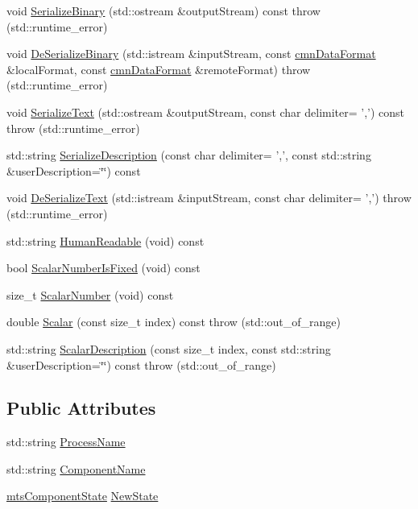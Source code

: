 \begin{DoxyCompactItemize}
\item 
void \hyperlink{classmts_component_state_change_a9d47989b56c5f09d4c5f45f1233be08f}{Serialize\-Binary} (std\-::ostream \&output\-Stream) const   throw (std\-::runtime\-\_\-error)
\item 
void \hyperlink{classmts_component_state_change_a94fcb305f49b48544d9622b5ba548994}{De\-Serialize\-Binary} (std\-::istream \&input\-Stream, const \hyperlink{classcmn_data_format}{cmn\-Data\-Format} \&local\-Format, const \hyperlink{classcmn_data_format}{cmn\-Data\-Format} \&remote\-Format)  throw (std\-::runtime\-\_\-error)
\item 
void \hyperlink{classmts_component_state_change_a5870510b594ed315dd9670f57e12ffa7}{Serialize\-Text} (std\-::ostream \&output\-Stream, const char delimiter= ',') const   throw (std\-::runtime\-\_\-error)
\item 
std\-::string \hyperlink{classmts_component_state_change_ac3189b3b0a8729f2e2d306d1a61c368c}{Serialize\-Description} (const char delimiter= ',', const std\-::string \&user\-Description=\char`\"{}\char`\"{}) const 
\item 
void \hyperlink{classmts_component_state_change_a77324cfbd0d3ff54e5bbf83019f1d758}{De\-Serialize\-Text} (std\-::istream \&input\-Stream, const char delimiter= ',')  throw (std\-::runtime\-\_\-error)
\item 
std\-::string \hyperlink{classmts_component_state_change_a0ae5594a59ccaa29c1d87cfa33a46e5f}{Human\-Readable} (void) const 
\item 
bool \hyperlink{classmts_component_state_change_aae2cdd8a44b6f58b4f0edb74aca68768}{Scalar\-Number\-Is\-Fixed} (void) const 
\item 
size\-\_\-t \hyperlink{classmts_component_state_change_a6bda338fada7251b74162d39db441c4e}{Scalar\-Number} (void) const 
\item 
double \hyperlink{classmts_component_state_change_ac12605fd78c373df55481fb12cded439}{Scalar} (const size\-\_\-t index) const   throw (std\-::out\-\_\-of\-\_\-range)
\item 
std\-::string \hyperlink{classmts_component_state_change_ae11813b368512c2cf58398319b9e2850}{Scalar\-Description} (const size\-\_\-t index, const std\-::string \&user\-Description=\char`\"{}\char`\"{}) const   throw (std\-::out\-\_\-of\-\_\-range)
\end{DoxyCompactItemize}
\subsection*{Public Attributes}
\begin{DoxyCompactItemize}
\item 
std\-::string \hyperlink{classmts_component_state_change_a47784c0fa820ca6789fc02049eb6f795}{Process\-Name}
\item 
std\-::string \hyperlink{classmts_component_state_change_afe02d7dd968c69a631917efb66c3f5a9}{Component\-Name}
\item 
\hyperlink{classmts_component_state}{mts\-Component\-State} \hyperlink{classmts_component_state_change_ae3abdb4b20508af94c78c01168d1cf0e}{New\-State}
\end{DoxyCompactItemize}


